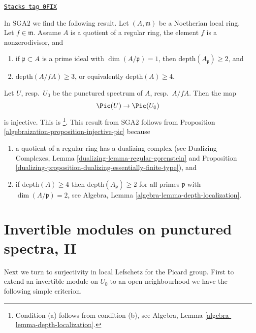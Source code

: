 \begin{remark}
\label{algebraization-remark-compare-SGA2}
\href{https://stacks.math.columbia.edu/tag/0FIX}{\texttt{Stacks tag 0FIX}}

In SGA2 we find the following result. Let $(A, \mathfrak m)$ be a
Noetherian local ring. Let $f \in \mathfrak m$. Assume $A$
is a quotient of a regular ring, the element
$f$ is a nonzerodivisor, and
\begin{enumerate}
\item[(a)] if $\mathfrak p \subset A$ is a prime ideal with
$\dim(A/\mathfrak p) = 1$, then $\text{depth}(A_\mathfrak p) \geq 2$, and
\item[(b)] $\text{depth}(A/fA) \geq 3$, or equivalently
$\text{depth}(A) \geq 4$.
\end{enumerate}
Let $U$, resp.\ $U_0$ be the punctured spectrum of $A$, resp.\ $A/fA$. Then
the map
$$
\Pic(U) \to \Pic(U_0)
$$
is injective. This is \cite[Exposee XI, Lemma 3.16]{SGA2}\footnote{Condition
(a) follows from condition (b), see
Algebra, Lemma \ref{algebra-lemma-depth-localization}.}. This result
from SGA2 follows from Proposition \ref{algebraization-proposition-injective-pic}
because
\begin{enumerate}
\item a quotient of a regular ring has a dualizing complex (see
Dualizing Complexes, Lemma \ref{dualizing-lemma-regular-gorenstein} and
Proposition \ref{dualizing-proposition-dualizing-essentially-finite-type}), and
\item if $\text{depth}(A) \geq 4$ then $\text{depth}(A_\mathfrak p) \geq 2$
for all primes $\mathfrak p$ with $\dim(A/\mathfrak p) = 2$, see
Algebra, Lemma \ref{algebra-lemma-depth-localization}.
\end{enumerate}
\end{remark}

\section{Invertible modules on punctured spectra, II}
\label{algebraization-section-local-lefschetz-for-pic-surjective}
Next we turn to surjectivity in local Lefschetz for the Picard group.
First to extend an invertible module on $U_0$ to an open neighbourhood
we have the following simple criterion.

